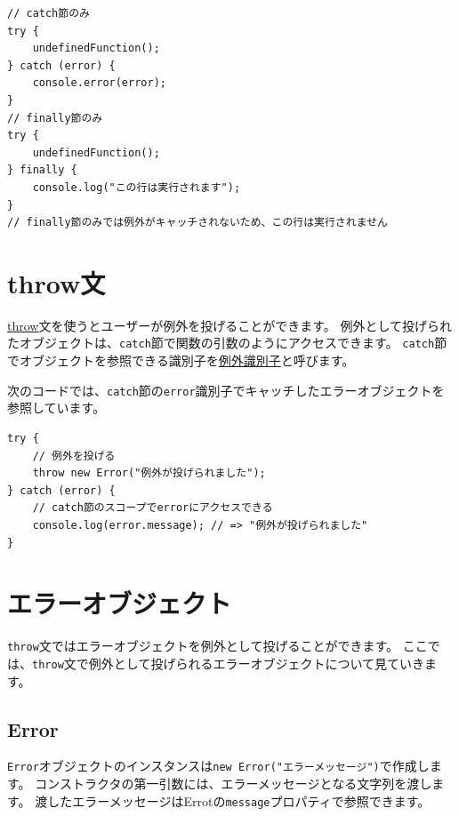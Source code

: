\begin{lstlisting}
// catch節のみ
try {
    undefinedFunction();
} catch (error) {
    console.error(error);
}
// finally節のみ
try {
    undefinedFunction();
} finally {
    console.log("この行は実行されます");
}
// finally節のみでは例外がキャッチされないため、この行は実行されません
\end{lstlisting}

\hypertarget{throw}{%
\section{throw文}\label{throw}}

\href{https://developer.mozilla.org/ja/docs/Web/JavaScript/Reference/Statements/throw}{throw}文を使うとユーザーが例外を投げることができます。
例外として投げられたオブジェクトは、\texttt{catch}節で関数の引数のようにアクセスできます。
\texttt{catch}節でオブジェクトを参照できる識別子を\href{https://developer.mozilla.org/ja/docs/Web/JavaScript/Reference/Statements/try...catch\#The_exception_identifier}{例外識別子}と呼びます。

次のコードでは、\texttt{catch}節の\texttt{error}識別子でキャッチしたエラーオブジェクトを参照しています。

\begin{lstlisting}
try {
    // 例外を投げる
    throw new Error("例外が投げられました");
} catch (error) {
    // catch節のスコープでerrorにアクセスできる
    console.log(error.message); // => "例外が投げられました"
}
\end{lstlisting}

\hypertarget{error-object}{%
\section{エラーオブジェクト}\label{error-object}}

\texttt{throw}文ではエラーオブジェクトを例外として投げることができます。
ここでは、\texttt{throw}文で例外として投げられるエラーオブジェクトについて見ていきます。
\newpage
\hypertarget{error}{%
\subsection{Error}\label{error}}

\texttt{Error}オブジェクトのインスタンスは\texttt{new Error("エラーメッセージ")}で作成します。
コンストラクタの第一引数には、エラーメッセージとなる文字列を渡します。
渡したエラーメッセージはErrotの\texttt{message}プロパティで参照できます。

